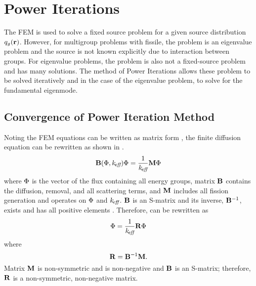 \section{Power Iterations}
  \label{sec:power_iterations}
  The FEM is used to solve a fixed source problem for a given source
  distribution $q_g(\mathbf{r})$. However, for multigroup problems with fissile,
  the problem is an eigenvalue problem and the source is not known explicitly 
  due to interaction between groups. For eigenvalue problems, the problem is 
  also not a fixed-source problem and has many solutions. The method of 
  Power Iterations allows these problem to be solved iteratively and in the
  case of the eigenvalue problem, to solve for the fundamental eigenmode.

  \subsection{Convergence of Power Iteration Method}
    Noting the FEM equations can be written as matrix form
    , the finite diffusion equation can be rewritten as
    shown in \cite{gehinThesis}.
    \begin{equation}
      \label{eq:gehin_notation}
      \mathbf{B}(\Phi,k_{\!\mbox{\scriptsize \em eff}}) \Phi = \frac{1}{k_{\!\mbox{\scriptsize \em eff}}} \mathbf{M} \Phi
    \end{equation}
    where $\Phi$ is the vector of the flux containing all energy groups, matrix 
    $\mathbf{B}$ contains the diffusion, removal, and all scattering terms, and $\mathbf{M}$ 
    includes all fission generation and operates on $\Phi$ and $k_{\!\mbox{\scriptsize \em eff}}$. $\mathbf{B}$
    is an S-matrix and its inverse, $\mathbf{B}^{-1}$, exists and has all positive 
    elements \cite{nakamura}. Therefore,  can be 
    rewritten as
    \begin{equation}
      \label{eq:gehin_solution}
      \Phi = \frac{1}{k_{\!\mbox{\scriptsize \em eff}}} \mathbf{R} \Phi
    \end{equation}
    where
    \begin{equation}
      \label{eq:gehin_r}
      \mathbf{R} = \mathbf{B}^{-1} \mathbf{M}.
    \end{equation}
    Matrix $\mathbf{M}$ is non-symmetric and is non-negative and $\mathbf{B}$ is an S-matrix;
    therefore, $\mathbf{R}$ is a non-symmetric, non-negative matrix.

